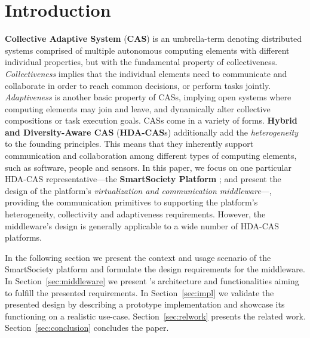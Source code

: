 %
\IEEEpeerreviewmaketitle



\section{Introduction}
\label{sec:intro}

  \textbf{Collective Adaptive System} (\textbf{CAS}) \cite{FoCASBook} is an umbrella-term denoting distributed systems comprised of multiple autonomous computing elements with different individual properties, but with the fundamental property of collectiveness. \emph{Collectiveness} implies that the individual elements need to communicate and collaborate in order to reach common decisions, or perform tasks jointly. \emph{Adaptiveness} is another basic property of CASs, implying open systems where computing elements may join and leave, and dynamically alter collective compositions or task execution goals. 
  CASs come in a variety of forms. \textbf{Hybrid and Diversity-Aware CAS} (\textbf{HDA-CAS}s) \cite{fausto} additionally add the \emph{heterogeneity} to the founding principles. This means that they inherently support communication and collaboration among different types of computing elements, such as software, people and sensors. 
  In this paper, we focus on one particular HDA-CAS representative---the \textbf{SmartSociety Platform} \cite{SmartSocBook}; and present the design of the platform's \emph{virtualization and communication middleware}---\textbf{\mdl{}}, providing the communication primitives to supporting the platform's heterogeneity, collectivity and adaptiveness requirements. However, the middleware's design is generally applicable to a wide number of HDA-CAS platforms.

  
  In the following section we present the context and usage scenario of the SmartSociety platform and formulate the design requirements for the \mdl{} middleware. In Section~\ref{sec:middleware} we present \mdl's architecture and functionalities aiming to fulfill the presented requirements. In Section~\ref{sec:impl} we validate the presented design by describing a prototype implementation and showcase its functioning on a realistic use-case. Section~\ref{sec:relwork} presents the related work. Section~\ref{sec:conclusion} concludes the paper.


